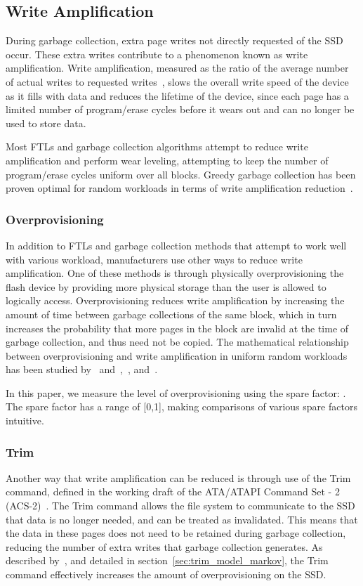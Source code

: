 \documentclass[prodmode,acmtos]{acmsmall}
\begin{document}
\subsection{Write Amplification}
During garbage collection, extra page writes not directly requested of the SSD occur.  These extra writes contribute to a phenomenon known as write amplification.  Write amplification, measured as the ratio of the average number of actual writes to requested writes~\cite{Hu2009}, slows the overall write speed of the device as it fills with data and reduces the lifetime of the device, since each page has a limited number of program/erase cycles before it wears out and can no longer be used to store data.

Most FTLs and garbage collection algorithms attempt to reduce write amplification and perform wear leveling, attempting to keep the number of program/erase cycles uniform over all blocks.  Greedy garbage collection has been proven optimal for random workloads in terms of write amplification reduction~\cite{hu2010fundamental}.

\subsubsection{Overprovisioning}
In addition to FTLs and garbage collection methods that attempt to work well with various workload, manufacturers use other ways to reduce write amplification.  One of these methods is through physically overprovisioning the flash device by providing more physical storage than the user is allowed to logically access.  Overprovisioning reduces write amplification by increasing the amount of time between garbage collections of the same block, which in turn increases the probability that more pages in the block are invalid at the time of garbage collection, and thus need not be copied.  The mathematical relationship between overprovisioning and write amplification in uniform random workloads has been studied by~ and~,~, and~.

In this paper, we measure the level of overprovisioning using the spare factor: .  The spare factor has a range of [0,1], making comparisons of various spare factors intuitive.

\subsubsection{Trim}
Another way that write amplification can be reduced is through use of the Trim command, defined in the working draft of the ATA/ATAPI Command Set - 2 (ACS-2)~\cite{TrimSpec}.  The Trim command allows the file system to communicate to the SSD that data is no longer needed, and can be treated as invalidated.  This means that the data in these pages does not need to be retained during garbage collection, reducing the number of extra writes that garbage collection generates.  As described by~, and detailed in section~\ref{sec:trim_model_markov}, the Trim command effectively increases the amount of overprovisioning on the SSD.
\end{document}
